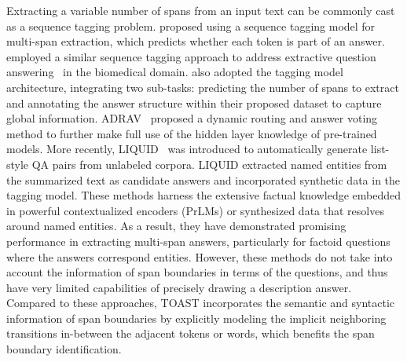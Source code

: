 \documentclass[a4paper]{cas-sc}
\newcommand{\1}[1]{\mathds{1}\left[#1\right]}
\begin{document}
Extracting a variable number of spans from an input text can be commonly cast as a sequence tagging problem.
\cite{segal2020simple} proposed using a sequence tagging model for multi-span extraction, which predicts whether each token is part of an answer. \cite{yoon2022} employed a similar sequence tagging approach to address extractive question answering~\citep{DBLP:journals/bmcbi/NaseemDKK22}  in the biomedical domain.
\cite{li2022multispanqa} also adopted the tagging model architecture, integrating two sub-tasks: predicting the number of spans to extract and annotating the answer structure within their proposed dataset to capture global information.
ADRAV~\citep{hu2023biomedical} proposed a dynamic routing and answer voting method to further make full use of the hidden layer knowledge of pre-trained models.
More recently, LIQUID~\citep{lee2023liquid} was introduced to  automatically generate list-style QA pairs from unlabeled corpora. LIQUID extracted named entities from the summarized text as candidate answers and incorporated synthetic data in the tagging model. 
These methods harness the extensive factual knowledge embedded in powerful contextualized encoders (PrLMs) or synthesized data that resolves around named entities. 
As a result, they have demonstrated promising performance in extracting  multi-span answers, particularly for factoid questions where the answers correspond entities.
However, these methods do not take into account the information of span boundaries in terms of the questions, and thus have very limited capabilities of precisely drawing a description answer. 
Compared to these approaches, TOAST incorporates the semantic and syntactic information of span boundaries by explicitly modeling the implicit neighboring transitions in-between the adjacent tokens or words, which benefits the span boundary identification.
\end{document}
